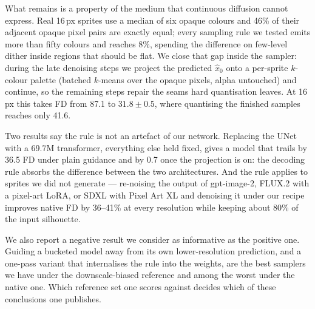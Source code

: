 \documentclass[10pt,twocolumn,letterpaper]{article}
\begin{document}
What remains is a property of the medium that continuous diffusion cannot express. Real 16\,px sprites use a median of
six opaque colours and 46\% of their adjacent opaque pixel pairs are exactly equal; every sampling rule we tested emits
more than fifty colours and reaches 8\%, spending the difference on few-level dither inside regions that should be
flat. We close that gap inside the sampler: during the late denoising steps we project the predicted $\hat x_0$ onto a
per-sprite $k$-colour palette (batched $k$-means over the opaque pixels, alpha untouched) and continue, so the
remaining steps repair the seams hard quantisation leaves. At 16\,px this takes FD from 87.1 to $31.8 \pm 0.5$, where
quantising the finished samples reaches only 41.6.

Two results say the rule is not an artefact of our network. Replacing the UNet with a 69.7M transformer, everything
else held fixed, gives a model that trails by 36.5 FD under plain guidance and by 0.7 once the projection is on: the
decoding rule absorbs the difference between the two architectures. And the rule applies to sprites we did not
generate --- re-noising the output of gpt-image-2, FLUX.2 with a pixel-art LoRA, or SDXL with Pixel Art XL and
denoising it under our recipe improves native FD by 36--41\% at every resolution while keeping about 80\% of the input
silhouette.

We also report a negative result we consider as informative as the positive one. Guiding a bucketed model away from
its own lower-resolution prediction, and a one-pass variant that internalises the rule into the weights, are the best
samplers we have under the downscale-biased reference and among the worst under the native one. Which reference set
one scores against decides which of these conclusions one publishes.
\end{document}
